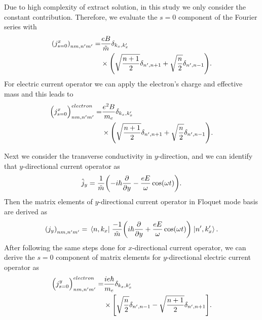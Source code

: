 Due to high complexity of extract solution, in this study we only consider the constant contribution. Therefore, we evaluate the $s=0$ component of the Fourier series with
\begin{equation} \label{eq_d10}
  \begin{aligned}
      \qty({j}^x_{s=0})_{nm,n'm'} =&
      \frac{eB}{{\tilde{m}}}
      \delta_{k_x,k'_x} \\
      & \times
      \qty(\sqrt{\frac{n+1}{2}} \delta_{n',n+1} + \sqrt{\frac{n}{2}}
      \delta_{n',n-1}).
  \end{aligned}
\end{equation}
For electric current operator we can apply the electron's charge and effective mass and this leads to
\begin{equation} \label{eq_d11}
  \begin{aligned}
      \Big({j}^x_{s=0}\Big)_{nm,n'm'}^{electron} =&
      \frac{e^2B}{{m_e}}
      \delta_{k_x,k'_x}\\
      & \times
      \qty(\sqrt{\frac{n+1}{2}} \delta_{n',n+1} + \sqrt{\frac{n}{2}}
      \delta_{n',n-1}).
  \end{aligned}
\end{equation}

Next we consider the transverse conductivity in $y$-direction, and we can identify that $y$-directional current operator as
\begin{equation} \label{eq_d12}
  \hat{j}_y = \frac{1}{\tilde{m}} \qty(-i\hbar\pdv{y} - \frac{eE}{\omega}\cos(\omega t)).
\end{equation}
Then the matrix elements of $y$-directional current operator in Floquet mode basis are derived as
\begin{equation} \label{eq_d13}
  \qty({j}_y)_{nm,n'm'} =
  \mel{n,k_x}{\;\frac{-1}{\tilde{m}} \qty(i\hbar\pdv{y} + \frac{eE}{\omega}\cos(\omega t))\;}{n',k'_x}.
\end{equation}
After following the same steps done for $x$-directional current operator, we can derive the $s=0$ component of matrix elements for $y$-directional electric current operator as
\begin{equation} \label{eq_d14}
  \begin{aligned}
    \Big({j}^y_{s=0}\Big)_{nm,n'm'}^{electron} = &
    \frac{ie\hbar}{{m_e}}
    \delta_{k_x,k'_x} \\
    & \times
    \qty[
    \sqrt{\frac{n}{2}} \delta_{n',n-1}
    - \sqrt{\frac{n+1}{2}} \delta_{n',n+1}
    ].
  \end{aligned}
\end{equation}
